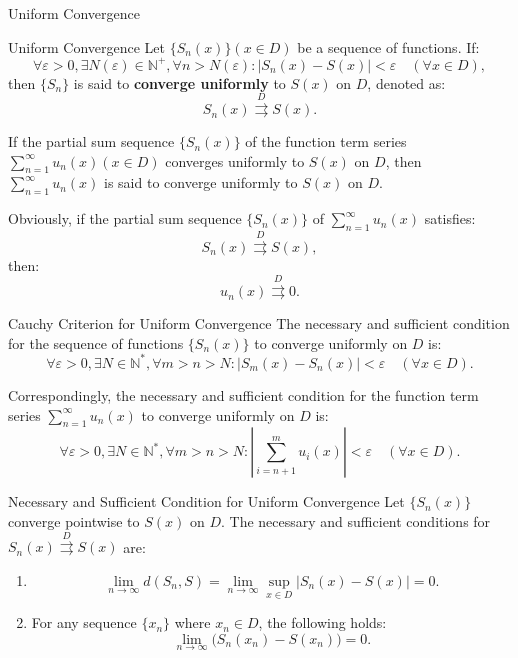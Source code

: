 \documentclass[11pt]{../../TexTemplate/elegantbook}
\begin{document}
\begin{leftbarTitle}{Uniform Convergence}\end{leftbarTitle}
\begin{definition}{Uniform Convergence}
    Let \( \{ S_n(x) \} (x \in D) \) be a sequence of functions. If:
    \[
    \forall \varepsilon > 0, \exists N(\varepsilon) \in \mathbb{N}^+, \forall n > N(\varepsilon): 
    |S_n(x) - S(x)| < \varepsilon \quad (\forall x \in D),
    \]
    then \( \{ S_n \} \) is said to \textbf{converge uniformly} to \( S(x) \) on \( D \), denoted as:
    \[
    S_n(x) \mathop{\rightrightarrows}\limits^{D} S(x).
    \]

    If the partial sum sequence \( \{ S_n(x) \} \) of the function term series 
    \( \sum_{n=1}^\infty u_n(x) (x \in D) \) converges uniformly to \( S(x) \) on \( D \), 
    then \( \sum_{n=1}^\infty u_n(x) \) is said to converge uniformly to \( S(x) \) on \( D \).
\end{definition}
Obviously, if the partial sum sequence \( \{ S_n(x) \} \) of \( \sum_{n=1}^\infty u_n(x) \) satisfies:
\[
S_n(x) \mathop{\rightrightarrows}\limits^{D} S(x),
\]
then:
\[
u_n(x) \mathop{\rightrightarrows}\limits^{D} 0.
\]

\begin{theorem}{Cauchy Criterion for Uniform Convergence}
    The necessary and sufficient condition for the sequence of functions \( \{ S_n(x) \} \) to converge uniformly on \( D \) is:
    \[
    \forall \varepsilon > 0, \exists N \in \mathbb{N}^*, \forall m > n > N: 
    |S_m(x) - S_n(x)| < \varepsilon \quad (\forall x \in D).
    \]

    Correspondingly, the necessary and sufficient condition for the function term series 
    \( \sum_{n=1}^\infty u_n(x) \) to converge uniformly on \( D \) is:
    \[
    \forall \varepsilon > 0, \exists N \in \mathbb{N}^*, \forall m > n > N: 
    \left| \sum_{i=n+1}^m u_i(x) \right| < \varepsilon \quad (\forall x \in D).
    \]
\end{theorem}

\begin{theorem}{Necessary and Sufficient Condition for Uniform Convergence}
    Let \( \{ S_n(x) \} \) converge pointwise to \( S(x) \) on \( D \). 
    The necessary and sufficient conditions for \( S_n(x) \mathop{\rightrightarrows}\limits^{D} S(x) \) are:
    \begin{enumerate}
        \item  
            \[
            \lim_{n \to \infty} d(S_n, S) = \lim_{n \to \infty} \sup_{x \in D} |S_n(x) - S(x)| = 0.
            \]
        \item For any sequence \( \{ x_n \} \) where \( x_n \in D \), the following holds:
            \[
            \lim_{n \to \infty} \big(S_n(x_n) - S(x_n)\big) = 0.
            \]
    \end{enumerate}
\end{theorem}
\end{document}
